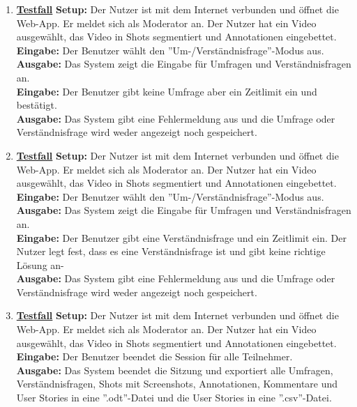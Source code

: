 \begin{enumerate}
	\item \underline{\textbf{Testfall}} \linebreak
	\textbf{Setup:} Der Nutzer ist mit dem Internet verbunden und öffnet die Web-App. Er meldet sich als Moderator an. Der Nutzer hat ein Video ausgewählt, das Video in Shots segmentiert und Annotationen eingebettet. \\
	\textbf{Eingabe:} Der Benutzer wählt den ''Um-/Verständnisfrage''-Modus aus. \\
	\textbf{Ausgabe:} Das System zeigt die Eingabe für Umfragen und Verständnisfragen an.\\ 
	\textbf{Eingabe:} Der Benutzer gibt keine Umfrage aber ein Zeitlimit ein und bestätigt.\\
	\textbf{Ausgabe:} Das System gibt eine Fehlermeldung aus und die Umfrage oder Verständnisfrage wird weder angezeigt noch gespeichert.
	
	\item \underline{\textbf{Testfall}} \linebreak
	\textbf{Setup:} Der Nutzer ist mit dem Internet verbunden und öffnet die Web-App. Er meldet sich als Moderator an. Der Nutzer hat ein Video ausgewählt, das Video in Shots segmentiert und Annotationen eingebettet. \\
	\textbf{Eingabe:} Der Benutzer wählt den ''Um-/Verständnisfrage''-Modus aus. \\
	\textbf{Ausgabe:} Das System zeigt die Eingabe für Umfragen und Verständnisfragen an.\\ 
	\textbf{Eingabe:} Der Benutzer gibt eine Verständnisfrage und ein Zeitlimit ein. Der Nutzer legt fest, dass es eine Verständnisfrage ist und gibt keine richtige Lösung an-\\
	\textbf{Ausgabe:} Das System gibt eine Fehlermeldung aus und die Umfrage oder Verständnisfrage wird weder angezeigt noch gespeichert.
	
	\item \underline{\textbf{Testfall}} \linebreak
	\textbf{Setup:} Der Nutzer ist mit dem Internet verbunden und öffnet die Web-App. Er meldet sich als Moderator an. Der Nutzer hat ein Video ausgewählt, das Video in Shots segmentiert und Annotationen eingebettet. \\
	\textbf{Eingabe:} Der Benutzer beendet die Session für alle Teilnehmer. \\
	\textbf{Ausgabe:} Das System beendet die Sitzung und exportiert alle Umfragen, Verständnisfragen, Shots mit Screenshots, Annotationen, Kommentare und User Stories in eine ''.odt''-Datei und die User Stories in eine ''.csv''-Datei.\\ 
	
\end{enumerate}
